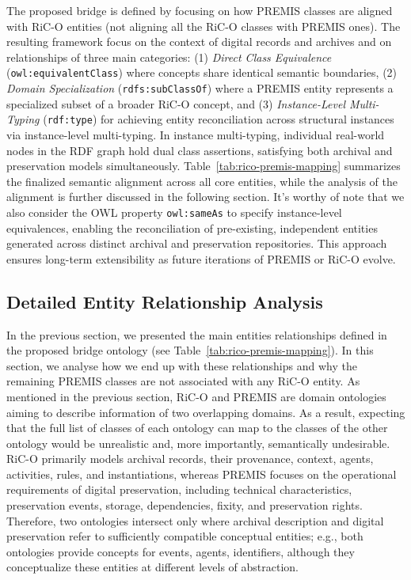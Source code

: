 \documentclass[runningheads]{llncs}
\begin{document}
 The proposed bridge is defined by focusing on how PREMIS classes are aligned with RiC-O entities (not aligning all the RiC-O classes with PREMIS ones). 
  The resulting framework focus on the context of digital records and archives and on relationships of three main categories: (1) \textit{Direct Class Equivalence} (\texttt{owl:equivalentClass}) where concepts share identical semantic boundaries, (2) \textit{Domain Specialization} (\texttt{rdfs:subClassOf}) where a PREMIS entity represents a specialized subset of a broader RiC-O concept, and (3) \textit{Instance-Level Multi-Typing} (\texttt{rdf:type}) for achieving entity reconciliation across structural instances via instance-level multi-typing.
  In instance multi-typing, individual real-world nodes in the RDF graph hold dual class assertions, satisfying both archival and preservation models simultaneously. Table~\ref{tab:rico-premis-mapping} summarizes the finalized semantic alignment across all core entities, while the analysis of the alignment is further discussed in the following section.
It's worthy of note that we also consider the OWL property \texttt{owl:sameAs} to specify instance-level equivalences, enabling the reconciliation of pre-existing, independent entities generated across distinct archival and preservation repositories. This approach ensures long-term extensibility as future iterations of PREMIS or RiC-O evolve.

	

\subsection{Detailed Entity Relationship Analysis}
\label{subsec:detailed-alignment}

In the previous section, we presented the main entities relationships defined in the proposed bridge ontology (see Table~\ref{tab:rico-premis-mapping}). In this section, we analyse how we end up with these relationships and why the remaining PREMIS classes are not associated with any RiC-O entity. As mentioned in the previous section, RiC-O and PREMIS are domain ontologies aiming to describe information of two overlapping domains. As a result, expecting that the full list of classes of each ontology can map to the classes of the other ontology would be unrealistic and, more importantly, semantically undesirable. RiC-O primarily models archival records, their provenance, context, agents, activities, rules, and instantiations, whereas PREMIS focuses on the operational requirements of digital preservation, including technical characteristics, preservation events, storage, dependencies, fixity, and preservation rights. Therefore, two ontologies intersect only where archival description and digital preservation refer to sufficiently compatible conceptual entities; e.g., both ontologies provide concepts for events, agents, identifiers, although they conceptualize these entities at different levels of abstraction.  
\end{document}
